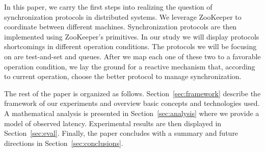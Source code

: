 In this paper, we carry the first steps into realizing the question of synchronization protocols in distributed systems. We leverage ZooKeeper to coordinate between different machines. Synchronization protocols are then implemented using ZooKeeper's primitives. In our study we will display protocols shortcomings in different operation conditions. The protocols we will be focusing on are test-and-set and queues. After we map each one of these two to a favorable operation condition, we lay the ground for a reactive mechanism that, according to current operation, choose the better protocol to manage synchronization.


The rest of the paper is organized as follows. Section~\ref{sec:framework} describe the framework of our experiments and overview basic concepts and technologies used. A mathematical analysis is presented in Section~\ref{sec:analysis} where we provide a model of observed latency. Experimental results are then displayed in Section~\ref{sec:eval}. Finally, the paper concludes with a summary and future directions in Section~\ref{sec:conclusions}.
